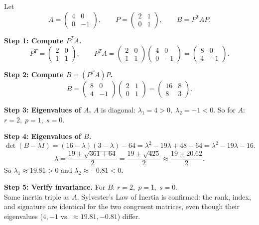\documentclass[12pt,a4paper]{article}
\begin{document}
Let
\[
A = \begin{pmatrix} 4 & 0 \\ 0 & -1 \end{pmatrix}, \qquad
P = \begin{pmatrix} 2 & 1 \\ 0 & 1 \end{pmatrix}, \qquad
B = P^{T} A P.
\]

\textbf{Step 1: Compute \(P^{T} A\).}
\[
P^{T} = \begin{pmatrix} 2 & 0 \\ 1 & 1 \end{pmatrix}, \qquad
P^{T} A = \begin{pmatrix} 2 & 0 \\ 1 & 1 \end{pmatrix}
          \begin{pmatrix} 4 & 0 \\ 0 & -1 \end{pmatrix}
        = \begin{pmatrix} 8 & 0 \\ 4 & -1 \end{pmatrix}.
\]

\textbf{Step 2: Compute \(B = (P^{T} A) P\).}
\[
B = \begin{pmatrix} 8 & 0 \\ 4 & -1 \end{pmatrix}
    \begin{pmatrix} 2 & 1 \\ 0 & 1 \end{pmatrix}
  = \begin{pmatrix} 16 & 8 \\ 8 & 3 \end{pmatrix}.
\]

\textbf{Step 3: Eigenvalues of \(A\).} \(A\) is diagonal: \(\lambda_1 = 4 > 0,\;
\lambda_2 = -1 < 0\). So for \(A\): \(r = 2,\; p = 1,\; s = 0\).

\textbf{Step 4: Eigenvalues of \(B\).}
\[
\det(B - \lambda I) = (16-\lambda)(3-\lambda) - 64
= \lambda^2 - 19\lambda + 48 - 64
= \lambda^2 - 19\lambda - 16.
\]
\[
\lambda = \frac{19 \pm \sqrt{361 + 64}}{2} = \frac{19 \pm \sqrt{425}}{2}
\approx \frac{19 \pm 20.62}{2}.
\]
So \(\lambda_1 \approx 19.81 > 0\) and \(\lambda_2 \approx -0.81 < 0\).

\textbf{Step 5: Verify invariance.} For \(B\): \(r = 2,\; p = 1,\; s = 0\). \\
Same inertia triple as \(A\). Sylvester's Law of Inertia is confirmed: the rank,
index, and signature are identical for the two congruent matrices, even though their
eigenvalues (\(4, -1\) vs. \(\approx 19.81, -0.81\)) differ.
\end{document}
